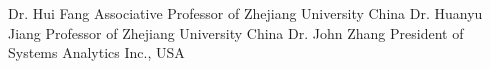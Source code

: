 \begin{cvreferees}
\cvreferee
{Dr. Hui Fang} 
{Associative Professor of Zhejiang University} 
{China}
\cvreferee
{Dr. Huanyu Jiang} 
{Professor of Zhejiang University} 
{China}
\cvreferee
{Dr. John Zhang} 
{President of Systems Analytics Inc.,} 
{USA}
\end{cvreferees}